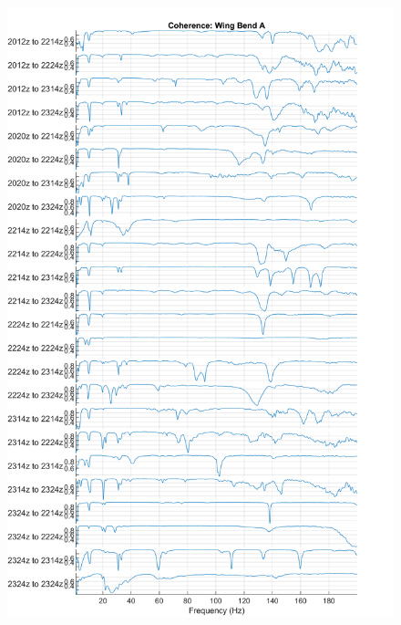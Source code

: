\begin{figure}
    \centering
    \includegraphics{figs/GVT/coh_Wing Bend A.png}
    \label{fig:coh_wingBendA}
\end{figure}

